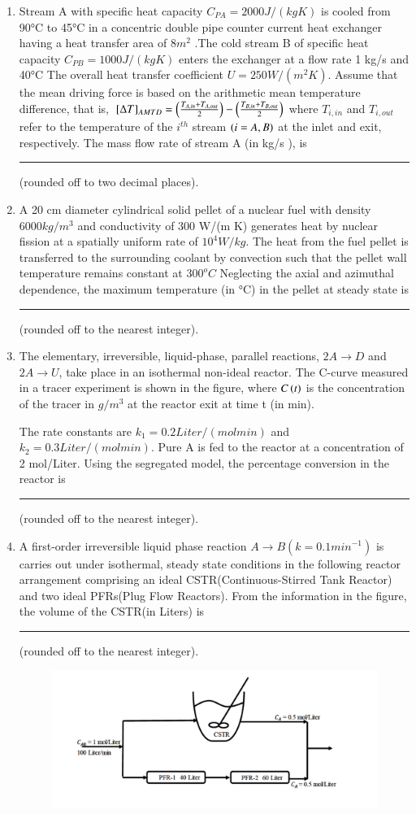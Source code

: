 \documentclass[journal]{IEEEtran}
\begin{document}
\begin{enumerate}
    \item Stream A with specific heat capacity $C_{PA}= 2000 J/(kg K)$ is cooled from 90°C to 45°C in a concentric double pipe counter current heat exchanger having a heat transfer area of $8m^2$ .The cold stream B of specific heat capacity $C_{PB} = 1000 J/(kg K)$ enters the exchanger at a flow rate 1 kg/s and 40°C The overall heat transfer coefficient $U = 250 W/(m^2 K)$. Assume that the mean driving force is based on the arithmetic mean temperature difference, that is, ${}\left[\Delta T\right]_{AMTD} = \left(\frac{T_{A,in} + T_{A,out}}{2}\right) - \left(\frac{T_{B,in} + T_{B,out}}{2}\right)$ where $T_{i,in}$ and $T_{i,out}$ refer to the temperature of the $i^{th}$ stream $\left(i = A, B\right)$ at the inlet and exit, respectively. The mass flow rate of stream A (in kg/s ), is \rule{2cm}{0.1mm}(rounded off to two decimal places).

    \item A 20 cm diameter cylindrical solid pellet of a nuclear fuel with density $6000 kg/m^3$ and conductivity of 300 W/(m K) generates heat by nuclear fission at a spatially uniform rate of $10^4 W /kg$. The heat from the fuel pellet is transferred to the surrounding coolant by convection such that the pellet wall temperature remains constant at $300^oC$ Neglecting the axial and azimuthal dependence, the maximum temperature (in °C) in the pellet at steady state is \rule{2cm}{0.1mm} (rounded off to the nearest integer). 

    \item The elementary, irreversible, liquid-phase, parallel reactions, $2A \to D$ and $2A\to U$, take place in an isothermal non-ideal reactor. The C-curve measured in a tracer experiment is shown in the figure, where $C\left(t\right)$ is the concentration of the tracer in $g/m^3$ at the reactor exit at time t (in min). 




    The rate constants are $k_1 = 0.2 Liter/(mol min)$ and $k_2 = 0.3 Liter/(mol min)$. Pure A is fed to the reactor at a concentration of 2 mol/Liter. Using the segregated model, the percentage conversion in the reactor is \rule{1.5cm}{0.1mm}(rounded off to the nearest integer).

    \item A first-order irreversible liquid phase reaction $A \to B(k = 0.1 min^{-1})$ is carries out under isothermal, steady state conditions in the following reactor arrangement comprising an ideal CSTR(Continuous-Stirred Tank Reactor) and two ideal PFRs(Plug Flow Reactors). From the information in the figure, the volume of the CSTR(in Liters) is \rule{1.5cm}{0.1mm}(rounded off to the nearest integer).
\begin{figure}[h!]
    \centering
    \includegraphics[width=0.6 \linewidth]{Fig/46.png}


\end{figure}
\end{enumerate}
\end{document}
